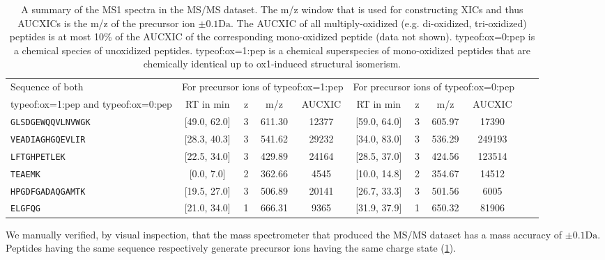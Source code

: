 \begin{table}
  \centering\small
  \begin{tabular}{ l c c c c c c c c c c}
  \toprule
  Sequence of both  
                                &\multicolumn{4}{l}{For precursor ions of \gls{typeof:ox=1:pep}}  
                                &\multicolumn{4}{l}{For precursor ions of \gls{typeof:ox=0:pep}}  \\      
  \gls{typeof:ox=1:pep} and \gls{typeof:ox=0:pep}    
                                & \gls{RT} in min    & z         & \gls{m/z}    & \gls{AUCXIC}  
                                & \gls{RT} in min    & z         & \gls{m/z}    & \gls{AUCXIC} 
                                \\\midrule
  \texttt{GLSDGEWQQVLNVWGK}     & [49.0, 62.0]   & 3         & 611.30 & 12377 & [59.0, 64.0] & 3 & 605.97 &  17390 \\
  \texttt{VEADIAGHGQEVLIR}      & [28.3, 40.3]   & 3         & 541.62 & 29232 & [34.0, 83.0] & 3 & 536.29 & 249193 \\
  \texttt{LFTGHPETLEK}          & [22.5, 34.0]   & 3         & 429.89 & 24164 & [28.5, 37.0] & 3 & 424.56 & 123514 \\
  \texttt{TEAEMK}               &  [0.0, 7.0]    & 2         & 362.66 &  4545 & [10.0, 14.8] & 2 & 354.67 &  14512 \\
  \texttt{HPGDFGADAQGAMTK}      & [19.5, 27.0]   & 3         & 506.89 & 20141 & [26.7, 33.3] & 3 & 501.56 &   6005 \\
  \texttt{ELGFQG}               & [21.0, 34.0]   & 1         & 666.31 &  9365 & [31.9, 37.9] & 1 & 650.32 &  81906 \\
  \bottomrule
  \end{tabular}
  \caption[A summary of the \gls{MS1} spectra in the \gls{MS/MS} dataset.]{
           A summary of the \gls{MS1} spectra in the \gls{MS/MS} dataset.
  The \gls{m/z} window that is used for constructing \glspl{XIC} and thus \glspl{AUCXIC} is the \gls{m/z} of the precursor ion \(\pm 0.1\si{\dalton}\).
  	The \gls{AUCXIC} of all multiply-oxidized (e.g. di-oxidized, tri-oxidized) peptides is at most 10\% of the \gls{AUCXIC} of the corresponding \gls{mono-oxidized} peptide (data not shown).
	\Gls{typeof:ox=0:pep} is a chemical species of unoxidized peptides.{}
  \Gls{typeof:ox=1:pep} is a chemical superspecies of \gls{mono-oxidized} peptides that are chemically identical up to \gls{ox1}-induced structural isomerism.
  \label{tab:oxlvl:6-tryptic-peptides}
  }
\end{table}
We manually verified, by visual inspection, that the mass spectrometer that produced the \gls{MS/MS} dataset has a mass accuracy of \(\pm0.1\si{\dalton}\).
Peptides having the same sequence respectively generate precursor ions having the same charge state (\cref{tab:oxlvl:6-tryptic-peptides}). 

